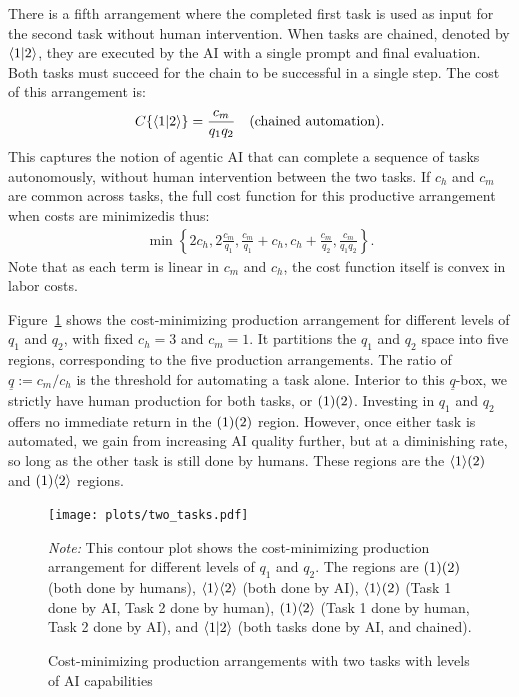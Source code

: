 \documentclass{article}
\begin{document}
There is a fifth arrangement where the completed first task is used as input for the second task without human intervention.
When tasks are chained, denoted by $\langle 1|2 \rangle$, they are executed by the AI with a single prompt and final evaluation.
Both tasks must succeed for the chain to be successful in a single step.
The cost of this arrangement is:
\begin{align*}
C\{ \langle 1|2 \rangle \} &= \frac{c_m}{q_1q_2} & \text{(chained automation)}.
\end{align*}
This captures the notion of agentic AI that can complete a sequence of tasks autonomously, without human intervention between the two tasks.
If $c_h$ and $c_m$ are common across tasks, the full cost function for this productive arrangement when costs are minimizedis thus: 
\begin{align}
  \min \left\{2c_h, 2 \frac{c_m}{q_1}, \frac{c_m}{q_1} + c_h, c_h + \frac{c_m}{q_2}, \frac{c_m}{q_1q_2} \right\}.
\end{align}
Note that as each term is linear in $c_m$ and $c_h$, the cost function itself is convex in labor costs. 

Figure~\ref{fig:two_tasks} shows the cost-minimizing production arrangement for different levels of $q_1$ and $q_2$, with fixed $c_h = 3$ and $c_m = 1$.
It partitions the $q_1$ and $q_2$ space into five regions, corresponding to the five production arrangements.
The ratio of $\underline{q} := c_m / c_h$ is the threshold for automating a task alone.
Interior to this $\underline{q}$-box, we strictly have human production for both tasks, or $( 1 )( 2 )$.
Investing in $q_1$ and $q_2$ offers no immediate return in the $( 1 )( 2 )$ region.
However, once either task is automated, we gain from increasing AI quality further, but at a diminishing rate, so long as the other task is still done by humans.
These regions are the $\langle 1 \rangle( 2 )$ and $( 1 )\langle 2 \rangle$ regions.

\begin{figure}
  \caption{Cost-minimizing production arrangements with two tasks with levels of AI capabilities} \label{fig:two_tasks}
  \begin{center}
  \texttt{[image: plots/two\_tasks.pdf]} \\
  \end{center}
\begin{footnotesize}
  \emph{Note:} This contour plot shows the cost-minimizing production arrangement for different levels of $q_1$ and $q_2$.
  The regions are $( 1 )( 2 )$ (both done by humans), $\langle 1 \rangle\langle 2 \rangle$ (both done by AI), $\langle 1 \rangle( 2 )$ (Task 1 done by AI, Task 2 done by human), $( 1 )\langle 2 \rangle$ (Task 1 done by human, Task 2 done by AI), and $\langle 1|2 \rangle$ (both tasks done by AI, and chained).
\end{footnotesize}
\end{figure}
\end{document}

